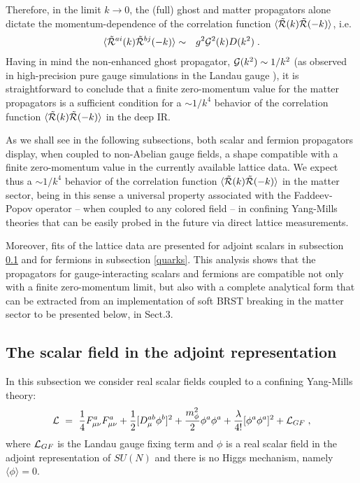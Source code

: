 Therefore, in the limit $k\to 0$, the (full) ghost and matter propagators alone dictate the momentum-dependence of the correlation function $\langle {\tilde {\cal R}}(k) {\tilde {\cal R}}(-k) \rangle$, i.e.
\begin{eqnarray}
\langle \tilde{\cal R}^{ai}(k) \tilde{\cal R}^{bj}(-k)
\rangle
&\sim& g^2 {\cal G}^2(k)D(k^2)
\;.
\end{eqnarray}
Having in mind the non-enhanced ghost propagator, ${\cal G}(k^2)\sim 1/k^2$ (as observed in high-precision pure gauge simulations in the Landau gauge \cite{Cucchieri:2007rg,Cucchieri:2008fc,Cucchieri:2011ig}), it is straightforward to conclude that a finite zero-momentum value for the matter propagators is a sufficient condition for a $\sim 1/k^4$  behavior of the correlation function $\langle {\tilde {\cal R}}(k) {\tilde {\cal R}}(-k) \rangle$ in the deep IR.

As we shall see in the following subsections, both scalar and fermion propagators display, when coupled to non-Abelian gauge fields, a shape compatible with a finite zero-momentum value in the currently available lattice data. We expect thus a $\sim 1/k^4$ behavior of  the correlation function $\langle {\tilde {\cal R}}(k) {\tilde {\cal R}}(-k) \rangle$ in the matter sector, being in this sense a universal property associated with the Faddeev-Popov operator -- when coupled to any colored field --  in confining Yang-Mills theories that can be easily probed in the future via direct lattice measurements.

Moreover, fits of the lattice data are presented for adjoint scalars in
subsection \ref{scalars} and for fermions in subsection \ref{quarks}. This analysis shows that the propagators for gauge-interacting scalars and fermions are compatible not only with a finite zero-momentum limit, but also with a complete analytical form that can be extracted from an implementation of soft BRST breaking in the matter sector to be presented below, in Sect.3. 




\subsection{The scalar field in the adjoint representation }
\label{scalars}

In this subsection we consider real scalar fields coupled to a confining Yang-Mills theory:
\begin{eqnarray}
{\cal L} ~=~ \frac{1}{4} F_{\mu\nu}^aF_{\mu\nu}^a +\frac{1}{2} [D_{\mu}^{ab}\phi^b]^2 + \frac{m_{\phi}^2}{2}\phi^a\phi^a +\frac{\lambda}{4!} [\phi^a\phi^a]^2  + {\cal L}_{GF}\;,
\end{eqnarray}
where  ${\cal L}_{GF}$ is the Landau gauge fixing term and $\phi$ is a real scalar field in the adjoint representation of $SU(N)$ and there is no Higgs mechanism, namely $\langle\phi\rangle = 0$.  

